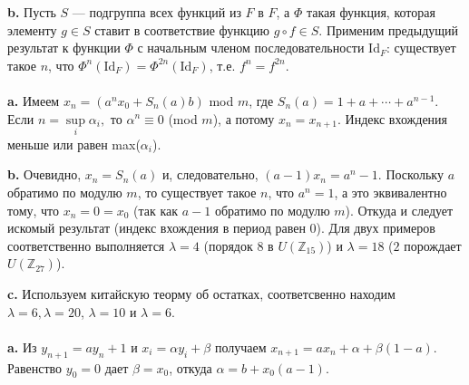 \documentclass{mai_book}
\begin{document}
\textbf{b. } Пусть $S$ --- подгруппа всех функций из $F$ в $F$, а $\Phi$ такая функция, которая элементу $g \in S$ ставит в соответствие функцию $g \circ f \in S$. Применим предыдущий результат к функции $\Phi$ с начальным членом последовательности Id$_{F}$: существует такое $n$, что ${\Phi}^n (\text{Id}_{F}) = {\Phi}^{2n} (\text{Id}_{F})$, т.е. $f^n = f^{2n}$. \\

 \\

\textbf{a. } Имеем $x_n = (a^n x_0 + S_n (a)b)$ mod $m$, где $S_n (a) = 1 + a + \cdots + a^{n-1}$. Если $n = \sup\limits_{i} {\alpha}_i,$ то ${\alpha}^n \equiv 0$ (mod $m$), а потому $x_n = x_{n+1}$. Индекс вхождения меньше или равен max(${\alpha}_i$). \smallskip

\textbf{b. } Очевидно, $x_n = S_n (a)$ и, следовательно, $(a-1)x_n = a^n - 1$.  Поскольку $a$ обратимо по модулю $m$, то существует такое $n$, что $a^n = 1$, а это эквивалентно тому, что $x_n = 0 = x_0$ (так как $a-1$ обратимо по модулю $m$). Откуда и следует искомый результат (индекс вхождения в период равен $0$). Для двух примеров соответственно выполняется $\lambda = 4$ (порядок $8$ в $U(\mathbb{Z}_{15})$) и $\lambda = 18$ ($2$ порождает $U(\mathbb{Z}_{27})$). \smallskip

\textbf{c. } Используем китайскую теорму об остатках, соответсвенно находим $\lambda = 6, \lambda = 20$, $\lambda = 10$ и $\lambda = 6$. \\

 \\

\textbf{a. } Из $y_{n+1} = ay_n +1$ и $x_i = {\alpha}y_i +\beta$ получаем $x_{n+1} = ax_n + \alpha + \beta (1 -a)$. Равенство $y_0 = 0$ дает $\beta = x_0$, откуда $\alpha = b+x_0 (a -1)$.\smallskip
\end{document}

